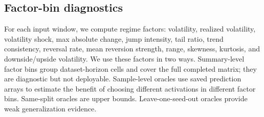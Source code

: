 \documentclass{article}
\begin{document}
\begin{table}[!htbp]
\centering
\caption{Activation configurations used in the completed Informer grid.}
\label{tab:activation_configs_draft}
\end{table}

\subsection{Factor-bin diagnostics}

For each input window, we compute regime factors: volatility, realized volatility, volatility shock, max absolute change, jump intensity, tail ratio, trend consistency, reversal rate, mean reversion strength, range, skewness, kurtosis, and downside/upside volatility. We use these factors in two ways. Summary-level factor bins group dataset-horizon cells and cover the full completed matrix; they are diagnostic but not deployable. Sample-level oracles use saved prediction arrays to estimate the benefit of choosing different activations in different factor bins. Same-split oracles are upper bounds. Leave-one-seed-out oracles provide weak generalization evidence.
\end{document}
